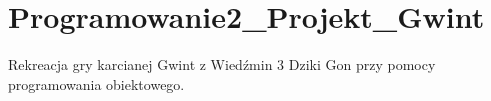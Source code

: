 \chapter{Programowanie2\+\_\+\+Projekt\+\_\+\+Gwint }
\hypertarget{md__r_e_a_d_m_e}{}\label{md__r_e_a_d_m_e}
\label{md__r_e_a_d_m_e_autotoc_md0}%
%


Rekreacja gry karcianej Gwint z Wiedźmin 3 Dziki Gon przy pomocy programowania obiektowego. 